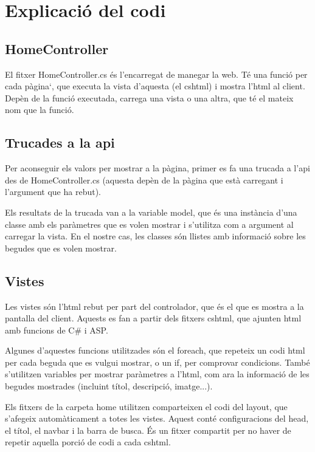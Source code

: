 \section{Explicaci\'o del codi}

\subsection{HomeController}
El fitxer HomeController.cs \'es l'encarregat de manegar la web.
T\'e una funci\'o per cada p\`agina`,
que executa la vista d'aquesta (el cshtml)
i mostra l'html al client.
Dep\`en de la funci\'o executada, carrega una vista o una altra,
que t\'e el mateix nom que la funci\'o.


\subsection{Trucades a la api}
Per aconseguir els valors per mostrar a la p\`agina,
primer es fa una trucada a l'api des de HomeController.cs
(aquesta dep\`en de la p\`agina que est\`a carregant i l'argument que ha rebut).

Els resultats de la trucada van a la variable model,
que \'es una inst\`ancia d'una classe amb els par\`ametres que es volen mostrar
i s'utilitza com a argument al carregar la vista.
En el nostre cas, les classes s\'on llistes amb informaci\'o sobre
les begudes que es volen mostrar.


\subsection{Vistes}
Les vistes s\'on l'html rebut per part del controlador,
que \'es el que es mostra a la pantalla del client.
Aquests es fan a partir dels fitxers cshtml,
que ajunten html amb funcions de C\# i ASP.

Algunes d'aquestes funcions utilitzades s\'on el foreach,
que repeteix un codi html per cada beguda que es vulgui mostrar,
o un if, per comprovar condicions.
Tamb\'e s'utilitzen variables per mostrar par\`ametres a l'html,
com ara la informaci\'o de les begudes mostrades
(incluint t\'itol, descripci\'o, imatge...).

Els fitxers de la carpeta home utilitzen comparteixen el codi del layout,
que s'afegeix autom\`aticament a totes les vistes.
Aquest cont\'e configuracions del head, el t\'itol, el navbar i la barra de busca.
\'Es un fitxer compartit per no haver de repetir aquella porci\'o de codi a cada cshtml.


